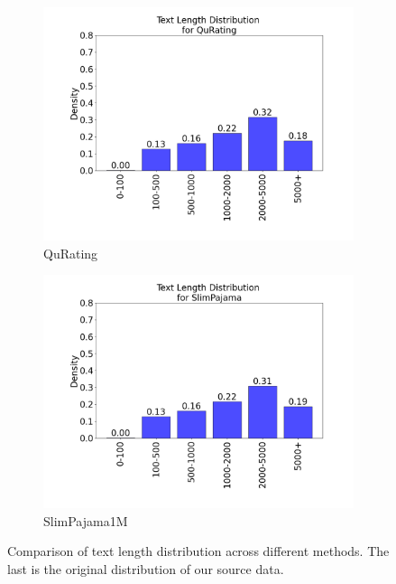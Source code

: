 \documentclass{article}
\begin{document}
\begin{figure}[H]
\begin{subfigure}{0.32\textwidth}
    \includegraphics[width=\linewidth]{figures/IMDB_data_length_distribution_plots/data_length_distribution_ft_4rules_QuRating.png}
    \caption{QuRating}
\end{subfigure}
\begin{subfigure}{0.32\textwidth}
    \includegraphics[width=\linewidth]{figures/IMDB_data_length_distribution_plots/data_length_distribution_SlimPajama1M.png}
    \caption{SlimPajama1M}
\end{subfigure}

\caption{Comparison of text length distribution across different methods. The last is the original distribution of our source data.} %
\label{fig:data_distribution_IMDB_length}
\end{figure}
\end{document}
